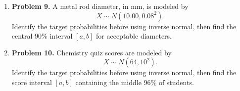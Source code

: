 \begin{enumerate}
	\item \textbf{Problem 9.} A metal rod diameter, in mm, is modeled by
	\[
	X \sim N(10.00, 0.08^2).
	\]
	Identify the target probabilities before using inverse normal, then find the central \(90\%\) interval \([a,b]\) for acceptable diameters.
	
	\item \textbf{Problem 10.} Chemistry quiz scores are modeled by
	\[
	X \sim N(64, 10^2).
	\]
	Identify the target probabilities before using inverse normal, then find the score interval \([a,b]\) containing the middle \(96\%\) of students.
	\end{enumerate}
	
